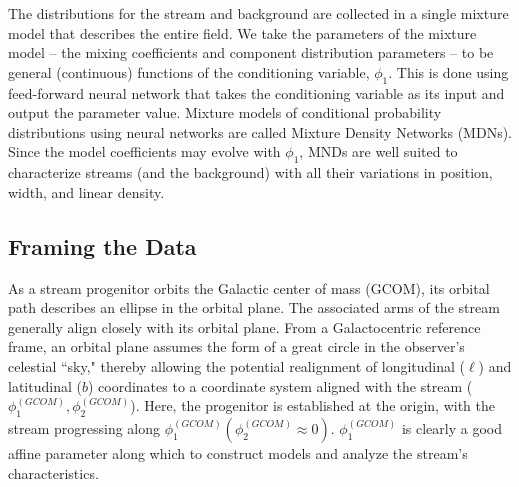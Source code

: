 \documentclass[twocolumn]{aastex631}
\newcommand{\smallcomponent}[2]{#2^{\scriptscriptstyle (#1)}}
\newcommand{\cmp}[2]{\smallcomponent{#1}{#2}}
\begin{document}
    The distributions for the stream and background are collected in a single mixture model that describes the entire field.
    We take the parameters of the mixture model -- the mixing coefficients and component distribution parameters -- to be general (continuous) functions of the conditioning variable, $\phi_1$. This is done using feed-forward neural network that takes the conditioning variable as its input and output the parameter value. Mixture models of conditional probability distributions using neural networks are called Mixture Density Networks (MDNs). Since the model coefficients may evolve with $\phi_1$, MNDs are well suited to characterize streams (and the background) with all their
    variations in position, width, and linear density.



    \subsection{Framing the Data} \label{sub:framing_the_data}

        As a stream progenitor orbits the Galactic center of mass (GCOM), its orbital path
        describes an ellipse in the orbital plane. The associated arms of the stream generally
        align closely with its orbital plane.
        From a Galactocentric reference frame, an orbital plane assumes the form of a great
        circle in the observer's celestial ``sky," thereby allowing the potential realignment of
        longitudinal ($\ell$) and latitudinal ($b$) coordinates to a coordinate system aligned
        with the stream ($\cmp{GCOM}{\phi_1}, \phi_2^{(GCOM)}$). Here, the progenitor is
        established at the origin, with the stream progressing along
        $\cmp{GCOM}{\phi_1} (\phi_2^{(GCOM)} \approx 0)$. $\cmp{GCOM}{\phi_1}$ is clearly a good
        affine parameter along which to construct models and analyze the stream's characteristics.
\end{document}
